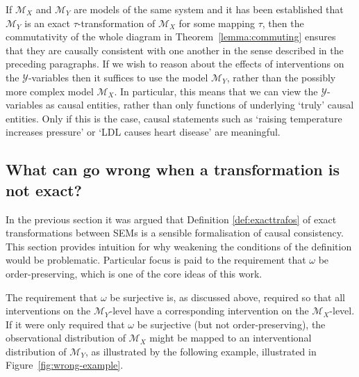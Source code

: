 If $\mathcal{M}_X$ and $\mathcal{M}_Y$ are models of the same system and it has been established that $\mathcal{M}_Y$ is an exact $\tau$-transformation of $\mathcal{M}_X$ for some mapping $\tau$, then the commutativity of the whole diagram in Theorem~\ref{lemma:commuting} ensures that they are causally consistent with one another in the sense described in the preceding paragraphs.
If we wish to reason about the effects of interventions on the $\mathcal{Y}$-variables then it suffices to use the model $\mathcal{M}_Y$, rather than the possibly more complex model $\mathcal{M}_X$.
In particular, this means that we can view the $\mathcal{Y}$-variables as causal entities, rather than only functions of underlying `truly' causal entities.
Only if this is the case, causal statements such as `raising temperature increases pressure' or `LDL causes heart disease' are meaningful.

\subsection{What can go wrong when a transformation is not exact?}\label{sec:wrong}

In the previous section it was argued that Definition \ref{def:exacttrafos} of exact transformations between SEMs is a sensible formalisation of causal consistency.
This section provides intuition for why weakening the conditions of the definition would be problematic.
Particular focus is paid to the requirement that $\omega$ be order-preserving, which is one of the core ideas of this work.

The requirement that $\omega$ be surjective is, as discussed above, required so that all interventions on the $\mathcal{M}_Y$-level have a corresponding intervention on the $\mathcal{M}_X$-level.
If it were only required that $\omega$ be surjective (but not order-preserving), the observational distribution of $\mathcal{M}_X$ might be mapped to an interventional distribution of $\mathcal{M}_Y$, as illustrated by the following example, illustrated in Figure~\ref{fig:wrong-example}.

